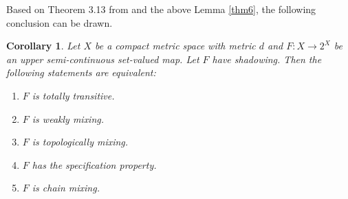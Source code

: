 \documentclass[12pt]{amsart}
\newtheorem{corollary}[theorem]{Corollary}
\theoremstyle{definition}
\begin{document}
Based on Theorem 3.13 from \cite{Luo2020} and the above Lemma \ref{thm6}, the following conclusion can be drawn.
\begin{corollary}
	Let $X$ be a compact metric space with metric $d$ and $F:X\rightarrow 2^X$ be an upper semi-continuous set-valued map. Let $F$ have shadowing. Then the following statements are equivalent:
	\begin{enumerate}
		\item $F$ is totally transitive.
		
		\item $F$ is weakly mixing.
		
		\item $F$ is topologically mixing.
		
		\item $F$ has the specification property.
		
		\item $F$ is chain mixing.
	\end{enumerate}
\end{corollary}
\end{document}
